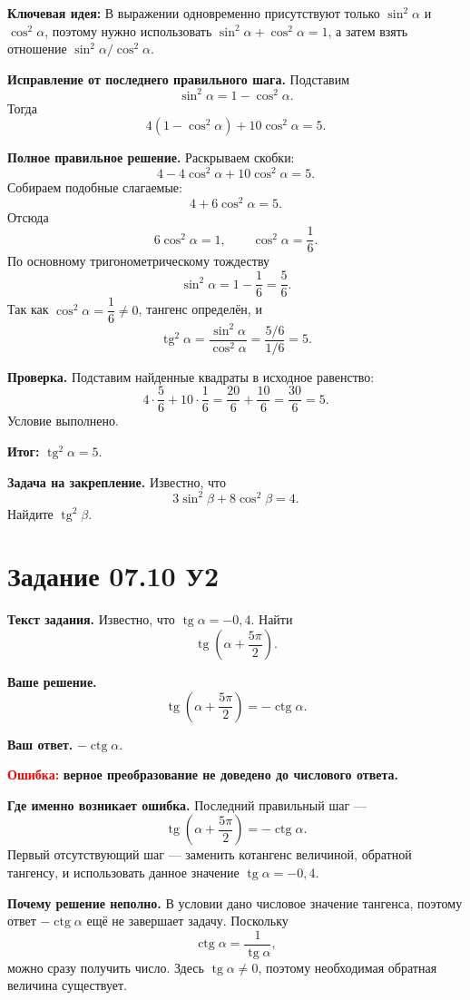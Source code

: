 \documentclass[12pt,a4paper]{article}
\newcommand{\errorlabel}[1]{\textcolor{red}{\textbf{Ошибка:}} \textbf{#1}}
\newcommand{\keyidea}{\textcolor{blue!60!black}{\textbf{Ключевая идея:}}}
\newcommand{\resultlabel}{\textcolor{teal!60!black}{\textbf{Итог:}}}
\begin{document}
\keyidea{} В выражении одновременно присутствуют только $\sin^2\alpha$ и $\cos^2\alpha$, поэтому нужно использовать $\sin^2\alpha+\cos^2\alpha=1$, а затем взять отношение $\sin^2\alpha/\cos^2\alpha$.

\textbf{Исправление от последнего правильного шага.} Подставим
\[
\sin^2\alpha=1-\cos^2\alpha.
\]
Тогда
\[
4(1-\cos^2\alpha)+10\cos^2\alpha=5.
\]

\textbf{Полное правильное решение.} Раскрываем скобки:
\[
4-4\cos^2\alpha+10\cos^2\alpha=5.
\]
Собираем подобные слагаемые:
\[
4+6\cos^2\alpha=5.
\]
Отсюда
\[
6\cos^2\alpha=1,
\qquad
\cos^2\alpha=\frac{1}{6}.
\]
По основному тригонометрическому тождеству
\[
\sin^2\alpha=1-\frac{1}{6}=\frac{5}{6}.
\]
Так как $\cos^2\alpha=\dfrac16\ne0$, тангенс определён, и
\[
\operatorname{tg}^2\alpha
=\frac{\sin^2\alpha}{\cos^2\alpha}
=\frac{5/6}{1/6}
=5.
\]

\textbf{Проверка.} Подставим найденные квадраты в исходное равенство:
\[
4\cdot\frac56+10\cdot\frac16
=\frac{20}{6}+\frac{10}{6}
=\frac{30}{6}
=5.
\]
Условие выполнено.

\resultlabel{} $\boxed{\operatorname{tg}^2\alpha=5}$.

\textbf{Задача на закрепление.} Известно, что
\[
3\sin^2\beta+8\cos^2\beta=4.
\]
Найдите $\operatorname{tg}^2\beta$.

\newpage
{}\label{task:0710u2}
\section*{Задание 07.10 У2}

\textbf{Текст задания.} Известно, что $\operatorname{tg}\alpha=-0{,}4$. Найти
\[
\operatorname{tg}\left(\alpha+\frac{5\pi}{2}\right).
\]

\textbf{Ваше решение.}
\[
\operatorname{tg}\left(\alpha+\frac{5\pi}{2}\right)=-\operatorname{ctg}\alpha.
\]

\textbf{Ваш ответ.} $-\operatorname{ctg}\alpha$.

\errorlabel{верное преобразование не доведено до числового ответа.}

\textbf{Где именно возникает ошибка.} Последний правильный шаг ---
\[
\operatorname{tg}\left(\alpha+\frac{5\pi}{2}\right)=-\operatorname{ctg}\alpha.
\]
Первый отсутствующий шаг --- заменить котангенс величиной, обратной тангенсу, и использовать данное значение $\operatorname{tg}\alpha=-0{,}4$.

\textbf{Почему решение неполно.} В условии дано числовое значение тангенса, поэтому ответ $-\operatorname{ctg}\alpha$ ещё не завершает задачу. Поскольку
\[
\operatorname{ctg}\alpha=\frac{1}{\operatorname{tg}\alpha},
\]
можно сразу получить число. Здесь $\operatorname{tg}\alpha\ne0$, поэтому необходимая обратная величина существует.
\end{document}
